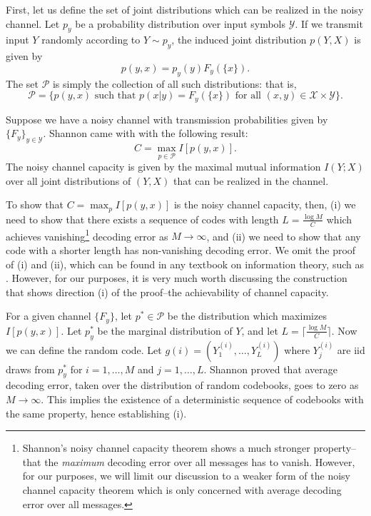 First, let us define the set of joint distributions which can be
realized in the noisy channel.  Let $p_y$ be a probability
distribution over input symbols $\mathcal{Y}$.  If we transmit input
$Y$ randomly according to $Y \sim p_y$, the induced joint distribution
$p(Y, X)$ is given by
\[
p(y, x) = p_y(y) F_y(\{x\}).
\]
The set $\mathcal{P}$ is simply the collection of all such distributions: that is,
\[
\mathcal{P} = \{p(y, x) \text{ such that } p(x|y) = F_y(\{x\})\text{ for all }(x, y) \in \mathcal{X} \times \mathcal{Y}\}.
\]

Suppose we have a noisy channel with transmission probabilities given by $\{F_y\}_{y \in \mathcal{Y}}$.
Shannon came with with the following result:
\[
C = \max_{p\in \mathcal{P}} I[p(y, x)].
\]
The noisy channel capacity is given by the maximal mutual information
$I(Y; X)$ over all joint distributions of $(Y, X)$ that can be
realized in the channel.

To show that $C = \max_p I[p(y, x)]$ is the noisy channel capacity,
then, (i) we need to show that there exists a sequence of codes with
length $L = \frac{\log M}{C}$ which achieves
vanishing\footnote{Shannon's noisy channel capacity theorem shows a
  much stronger property--that the \emph{maximum} decoding error over
  all messages has to vanish.  However, for our purposes, we will
  limit our discussion to a weaker form of the noisy channel capacity
  theorem which is only concerned with average decoding error over all
  messages.} decoding error as $M \to \infty$, and (ii) we need to
show that any code with a shorter length has non-vanishing decoding
error.  We omit the proof of (i) and (ii), which can be found in any
textbook on information theory, such as \cite{Cover2006}.  However,
for our purposes, it is very much worth discussing the construction
that shows direction (i) of the proof--the achievability of channel
capacity.

For a given channel $\{F_y\}$, let $p^* \in \mathcal{P}$ be the
distribution which maximizes $I[p(y, x)]$.  Let $p^*_y$ be the
marginal distribution of $Y$, and let $L = \lceil \frac{\log M}{C}
\rceil$.  Now we can define the random code.  Let $g(i) =
(Y_1^{(i)},\hdots, Y_L^{(i)})$ where $Y_j^{(i)}$ are iid draws from
$p^*_y$ for $i = 1,\hdots, M$ and $j = 1,\hdots, L$.  Shannon proved
that average decoding error, taken over the distribution of random
codebooks, goes to zero as $M \to \infty$.  This implies the existence
of a deterministic sequence of codebooks with the same property, hence
establishing (i).


